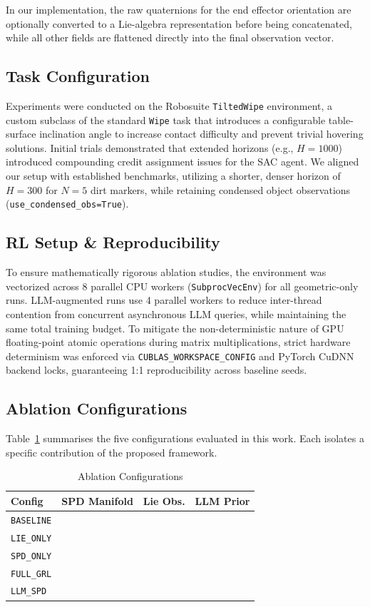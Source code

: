 \documentclass[letterpaper, 10 pt, conference]{IEEEtran}
\newcommand{\cmark}{\ding{51}}
\newcommand{\xmark}{\ding{55}}
\begin{document}
In our implementation, the raw quaternions for the end effector orientation are optionally converted to a Lie-algebra representation before being concatenated, while all other fields are flattened directly into the final observation vector.

\subsection{Task Configuration}
Experiments were conducted on the Robosuite \texttt{TiltedWipe} environment, a custom subclass of the standard \texttt{Wipe} task that introduces a configurable table-surface inclination angle to increase contact difficulty and prevent trivial hovering solutions. Initial trials demonstrated that extended horizons (e.g., $H=1000$) introduced compounding credit assignment issues for the SAC agent. We aligned our setup with established benchmarks, utilizing a shorter, denser horizon of $H=300$ for $N=5$ dirt markers, while retaining condensed object observations (\texttt{use\_condensed\_obs=True}).

\subsection{RL Setup \& Reproducibility}
To ensure mathematically rigorous ablation studies, the environment was vectorized across 8 parallel CPU workers (\texttt{SubprocVecEnv}) for all geometric-only runs. LLM-augmented runs use 4 parallel workers to reduce inter-thread contention from concurrent asynchronous LLM queries, while maintaining the same total training budget. To mitigate the non-deterministic nature of GPU floating-point atomic operations during matrix multiplications, strict hardware determinism was enforced via \texttt{CUBLAS\_WORKSPACE\_CONFIG} and PyTorch CuDNN backend locks, guaranteeing 1:1 reproducibility across baseline seeds.

\subsection{Ablation Configurations}
\label{sec:ablation_configs}
Table~\ref{tab:ablation_configs} summarises the five configurations evaluated in this work.
Each isolates a specific contribution of the proposed framework.

\begin{table}[h]
\centering
\caption{Ablation Configurations}
\label{tab:ablation_configs}
\begin{tabular}{@{}lccc@{}}
\toprule
\textbf{Config} & \textbf{SPD Manifold} & \textbf{Lie Obs.} & \textbf{LLM Prior} \\ \midrule
\texttt{BASELINE}  & \xmark & \xmark & \xmark \\
\texttt{LIE\_ONLY} & \xmark & \cmark & \xmark \\
\texttt{SPD\_ONLY} & \cmark & \xmark & \xmark \\
\texttt{FULL\_GRL} & \cmark & \cmark & \xmark \\
\texttt{LLM\_SPD}  & \cmark & \xmark & \cmark \\ \bottomrule
\end{tabular}
\end{table}
\end{document}
